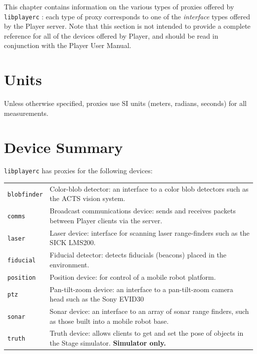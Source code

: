 \documentclass[11pt]{report}
\def\libplayerc {{\tt libplayerc} }
\begin{document}
This chapter contains information on the various types of proxies
offered by \libplayerc: each type of proxy corresponds to one of the
{\em interface} types offered by the Player server.  Note that this
section is not intended to provide a complete reference for all of the
devices offered by Player, and should be read in conjunction with the
Player User Manual.


\section{Units}

Unless otherwise specified, proxies use SI units (meters, radians,
seconds) for all measurements.

\section{Device Summary}

\libplayerc has proxies for the following devices:

\noindent
\begin{tabularx}{\columnwidth}{lX}
\hline
{\tt blobfinder} & Color-blob detector: an interface to a color blob detectors such as the
ACTS vision system.\\
{\tt comms} & Broadcast communications device: sends and receives packets between Player
clients via the server.\\
{\tt laser} & Laser device: interface for scanning laser range-finders
such as the SICK LMS200.\\
{\tt fiducial} & Fiducial detector: detects fiducials (beacons) placed in the
environment.\\
{\tt position} & Position device: for control of a mobile robot platform.\\
{\tt ptz} & Pan-tilt-zoom device: an interface to a pan-tilt-zoom camera
head such as the Sony EVID30 \\
{\tt sonar} & Sonar device: an interface to an array of sonar range finders, 
such as those built into a mobile robot base.\\
{\tt truth} & Truth device: allows clients to get and set the pose of
objects in the Stage simulator.  {\bf Simulator only.}\\
\hline
\end{tabularx}
\end{document}
